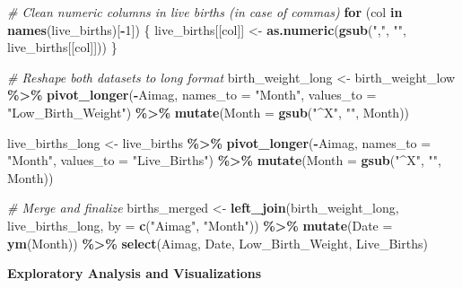 \documentclass[
]{article}
\newenvironment{Shaded}{\begin{snugshade}}{\end{snugshade}}
\newcommand{\AttributeTok}[1]{\textcolor[rgb]{0.13,0.29,0.53}{#1}}
\newcommand{\CommentTok}[1]{\textcolor[rgb]{0.56,0.35,0.01}{\textit{#1}}}
\newcommand{\ControlFlowTok}[1]{\textcolor[rgb]{0.13,0.29,0.53}{\textbf{#1}}}
\newcommand{\DecValTok}[1]{\textcolor[rgb]{0.00,0.00,0.81}{#1}}
\newcommand{\FunctionTok}[1]{\textcolor[rgb]{0.13,0.29,0.53}{\textbf{#1}}}
\newcommand{\NormalTok}[1]{#1}
\newcommand{\OtherTok}[1]{\textcolor[rgb]{0.56,0.35,0.01}{#1}}
\newcommand{\SpecialCharTok}[1]{\textcolor[rgb]{0.81,0.36,0.00}{\textbf{#1}}}
\newcommand{\StringTok}[1]{\textcolor[rgb]{0.31,0.60,0.02}{#1}}
\begin{document}
\begin{Shaded}
\begin{Highlighting}[]
\CommentTok{\# Clean numeric columns in live births (in case of commas)}
\ControlFlowTok{for}\NormalTok{ (col }\ControlFlowTok{in} \FunctionTok{names}\NormalTok{(live\_births)[}\SpecialCharTok{{-}}\DecValTok{1}\NormalTok{]) \{}
\NormalTok{  live\_births[[col]] }\OtherTok{\textless{}{-}} \FunctionTok{as.numeric}\NormalTok{(}\FunctionTok{gsub}\NormalTok{(}\StringTok{","}\NormalTok{, }\StringTok{""}\NormalTok{, live\_births[[col]]))}
\NormalTok{\}}

\CommentTok{\# Reshape both datasets to long format}
\NormalTok{birth\_weight\_long }\OtherTok{\textless{}{-}}\NormalTok{ birth\_weight\_low }\SpecialCharTok{\%\textgreater{}\%}
  \FunctionTok{pivot\_longer}\NormalTok{(}\SpecialCharTok{{-}}\NormalTok{Aimag, }\AttributeTok{names\_to =} \StringTok{"Month"}\NormalTok{, }\AttributeTok{values\_to =} \StringTok{"Low\_Birth\_Weight"}\NormalTok{) }\SpecialCharTok{\%\textgreater{}\%}
  \FunctionTok{mutate}\NormalTok{(}\AttributeTok{Month =} \FunctionTok{gsub}\NormalTok{(}\StringTok{"\^{}X"}\NormalTok{, }\StringTok{""}\NormalTok{, Month))}

\NormalTok{live\_births\_long }\OtherTok{\textless{}{-}}\NormalTok{ live\_births }\SpecialCharTok{\%\textgreater{}\%}
  \FunctionTok{pivot\_longer}\NormalTok{(}\SpecialCharTok{{-}}\NormalTok{Aimag, }\AttributeTok{names\_to =} \StringTok{"Month"}\NormalTok{, }\AttributeTok{values\_to =} \StringTok{"Live\_Births"}\NormalTok{) }\SpecialCharTok{\%\textgreater{}\%}
  \FunctionTok{mutate}\NormalTok{(}\AttributeTok{Month =} \FunctionTok{gsub}\NormalTok{(}\StringTok{"\^{}X"}\NormalTok{, }\StringTok{""}\NormalTok{, Month))}

\CommentTok{\# Merge and finalize}
\NormalTok{births\_merged }\OtherTok{\textless{}{-}} \FunctionTok{left\_join}\NormalTok{(birth\_weight\_long, live\_births\_long, }\AttributeTok{by =} \FunctionTok{c}\NormalTok{(}\StringTok{"Aimag"}\NormalTok{, }\StringTok{"Month"}\NormalTok{)) }\SpecialCharTok{\%\textgreater{}\%}
  \FunctionTok{mutate}\NormalTok{(}\AttributeTok{Date =} \FunctionTok{ym}\NormalTok{(Month)) }\SpecialCharTok{\%\textgreater{}\%}
  \FunctionTok{select}\NormalTok{(Aimag, Date, Low\_Birth\_Weight, Live\_Births)}
\end{Highlighting}
\end{Shaded}

\textbf{Exploratory Analysis and Visualizations}
\end{document}
